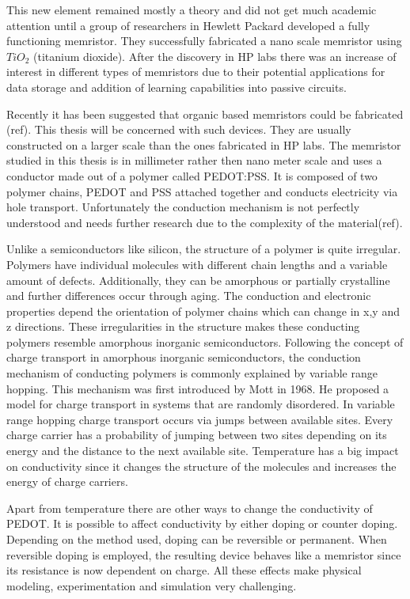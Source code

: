 \begin{doublespace}
This new element remained mostly a theory and did not get much academic attention until a group of researchers in Hewlett Packard developed a fully functioning memristor. They successfully fabricated a nano scale memristor using $TiO_2$ (titanium dioxide). After the discovery in HP labs there was an increase of interest in different types of memristors due to their potential applications for data storage and addition of learning capabilities into passive circuits. 

Recently it has been suggested that organic based memristors could be fabricated (ref). This thesis will be concerned with such devices. They are usually constructed on a larger scale than the ones fabricated in HP labs. The memristor studied in this thesis is in millimeter rather then nano meter scale and uses a conductor made out of a polymer called PEDOT:PSS. It is composed of two polymer chains, PEDOT and PSS attached together and conducts electricity via hole transport. Unfortunately the conduction mechanism is not perfectly understood and needs further research due to the complexity of the material(ref).

Unlike a semiconductors like silicon, the structure of a polymer is quite irregular. Polymers have individual molecules with different chain lengths and a variable amount of defects.
Additionally, they can be amorphous or partially crystalline and further differences occur through aging. The conduction and electronic properties depend the orientation of polymer chains which can change in x,y and z directions. These irregularities in the structure makes these conducting polymers resemble amorphous inorganic semiconductors. Following the concept of charge transport in amorphous inorganic semiconductors, the conduction mechanism of conducting polymers is commonly explained by variable range hopping. This mechanism was first introduced by Mott in 1968. He proposed a model for charge transport in systems that are randomly disordered. In variable range hopping charge transport occurs via jumps between available sites. Every charge carrier has a probability of jumping between two sites depending on its energy and the distance to the next available site. Temperature has a big impact on conductivity since it changes the structure of the molecules and increases the energy of charge carriers.

Apart from temperature there are other ways to change the conductivity of PEDOT. It is possible to affect conductivity by either doping or counter doping. Depending on the method used, doping can be reversible or permanent. When reversible doping is employed, the resulting device behaves like a memristor since its resistance is now dependent on charge. All these effects make physical modeling, experimentation and simulation very challenging. 


\end{doublespace}
